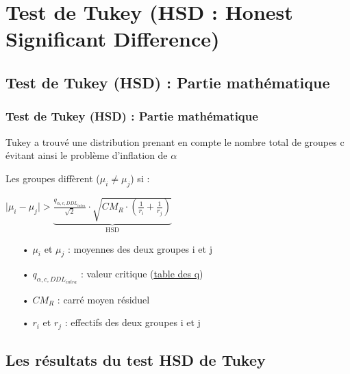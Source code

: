 \documentclass{beamer}
\begin{document}
\section{Test de Tukey (HSD : Honest Significant Difference)}

\subsection{Test de Tukey (HSD) : Partie mathématique}
\begin{frame}
	\frametitle{Test de Tukey (HSD) : Partie mathématique}
	 Tukey a trouvé une distribution prenant en compte le nombre total de groupes c évitant ainsi le problème d'inflation de $\alpha$
	\begin{block}{Les groupes diffèrent ($\mu_i \neq \mu_j$) si :}
		\begin{center}
		 $\mid{\mu_i-\mu_j}\mid > \underbrace{\frac{q_{\alpha,c,DDL_{intra}}}{\sqrt{2}} \cdot \sqrt{CM_R \cdot (\frac{1}{r_i}+\frac{1}{r_j})}}_{\text{HSD}}$ 
		 \end{center}
	\end{block}
		\begin{itemize}
		\item[•] $\mu_i$ et $\mu_j$ : moyennes des deux groupes i et j
		\item[•] $q_{\alpha,c,DDL_{intra}}$ : valeur critique (\href{http://www.real-statistics.com/statistics-tables/studentized-range-q-table/}{\underline{table des q}})
		\item[•] $CM_R$ : carré moyen résiduel
		\item[•] $r_i$ et $r_j$ : effectifs des deux groupes i et j
		\end{itemize}
\end{frame}

\subsection{Les résultats du test HSD de Tukey}
\end{document}
